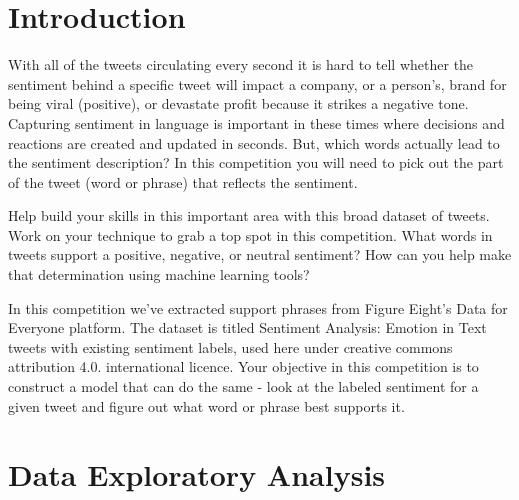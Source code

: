 \section{Introduction}
\label{sec-intro}

With all of the tweets circulating every second it is hard to tell whether the sentiment behind a specific tweet
 will impact a company, or a person's, brand for being viral (positive), or devastate profit because it strikes a 
 negative tone. Capturing sentiment in language is important in these times where decisions and reactions are
  created and updated in seconds. But, which words actually lead to the sentiment description? In this competition 
  you will need to pick out the part of the tweet (word or phrase) that reflects the sentiment.

Help build your skills in this important area with this broad dataset of tweets. Work on your technique 
to grab a top spot in this competition. What words in tweets support a positive, negative, or neutral sentiment? 
How can you help make that determination using machine learning tools?

In this competition we've extracted support phrases from Figure Eight's Data for Everyone platform. 
The dataset is titled Sentiment Analysis: Emotion in Text tweets with existing sentiment labels, 
used here under creative commons attribution 4.0. international licence. Your objective in this competition 
is to construct a model that can do the same - look at the labeled sentiment for a given tweet and figure
 out what word or phrase best supports it.\\


















\section{Data Exploratory Analysis } \label{sec-preliminaries}

